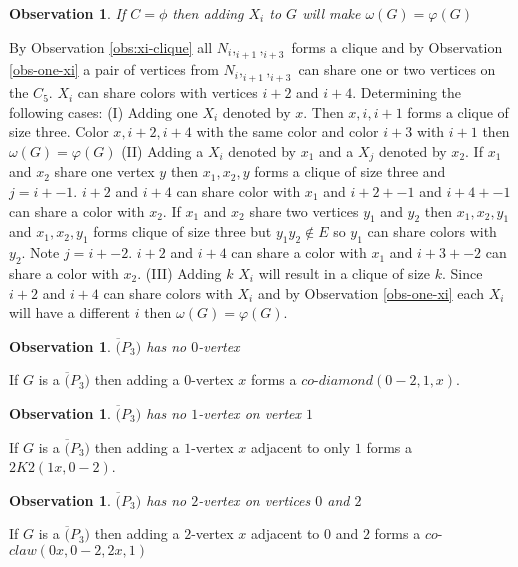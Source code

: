 \documentclass[12pt]{article}
\newtheorem{Observation}[Theorem]{Observation}
\begin{document}
\begin{Observation}\label{obs:xi-not-critical}
If $C = \phi$ then adding $X_i$ to $G$ will make $\omega(G) = \varphi(G)$
\end{Observation}
 By Observation \ref{obs:xi-clique} all $N_i,_{i+1},_{i+3}$ forms a clique and by Observation \ref{obs-one-xi} a pair of vertices from $N_i,_{i+1},_{i+3}$ can share one or two vertices on the $C_5$. $X_i$ can share colors with vertices $i+2$ and $i+4$. Determining the following cases:
(I) Adding one $X_i$ denoted by $x$. Then $x, i,i+1$ forms a clique of size three. Color $x, i+2, i+4$ with the same color and color $i+3$ with $i+1$ then $\omega(G) = \varphi(G)$
(II) Adding a $X_i$ denoted by $x_1$ and  a $X_j$  denoted by $x_2$. If $x_1$ and $x_2$ share one vertex $y$ then $x_1, x_2, y$ forms a clique of size three and $j = i +-1$. $i+2$ and $i+4$ can share color with $x_1$ and $i+2 +-1$ and $i+4 +- 1$ can share a color with $x_2$. If $x_1$ and $x_2$ share two vertices $y_1$ and $y_2$ then $x_1, x_2, y_1$ and $x_1, x_2, y_1$ forms clique of size three but $y_1y_2 \not \in E$ so $y_1$ can share colors with $y_2$. Note $j = i +- 2$. $i+2$ and  $i+4$ can share a color with $x_1$ and $i + 3 +- 2$ can share a color with $x_2$.
(III) Adding $k$ $X_i$ will result in a clique of size $k$. Since $i+2$ and $i+4$ can share colors with $X_i$ and by Observation \ref{obs-one-xi} each $X_i$ will have a different $i$ then $\omega(G) = \varphi(G)$.



\begin{Observation}\label{obs:cop3-pattern}
$\overline(P_3)$ has no $0$-vertex
\end{Observation}
 If $G$ is a $\overline(P_3)$ then adding a $0$-vertex $x$ forms a $co$-$diamond (0-2, 1, x)$.

\begin{Observation}\label{obs:cop3-pattern2}
$\overline(P_3)$ has no $1$-vertex on vertex $1$
\end{Observation}
 If $G$ is a $\overline(P_3)$ then adding a $1$-vertex $x$ adjacent to only $1$ forms a $2K2 (1x, 0-2)$.

\begin{Observation}\label{obs:cop3-pattern3}
$\overline(P_3)$ has no $2$-vertex on vertices $0$ and $2$
\end{Observation}
 If $G$ is a $\overline(P_3)$ then adding a $2$-vertex $x$ adjacent to $0$ and $2$ forms a $co$-$claw (0x,0-2,2x, 1)$
\end{document}
